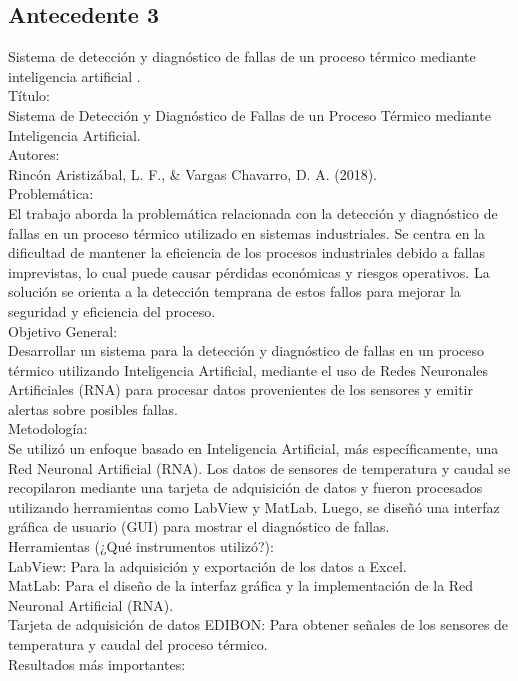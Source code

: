 \subsection{Antecedente 3}
Sistema de detección y diagnóstico de fallas de un proceso térmico mediante
inteligencia artificial \cite{Var} . \\
Título:\\
Sistema de Detección y Diagnóstico de Fallas de un Proceso Térmico mediante Inteligencia Artificial. \\
Autores: \\
Rincón Aristizábal, L. F., \& Vargas Chavarro, D. A. (2018). \\
Problemática: \\
El trabajo aborda la problemática relacionada con la detección y diagnóstico de fallas en un proceso térmico utilizado en sistemas industriales. Se centra en la dificultad de mantener la eficiencia de los procesos industriales debido a fallas imprevistas, lo cual puede causar pérdidas económicas y riesgos operativos. La solución se orienta a la detección temprana de estos fallos para mejorar la seguridad y eficiencia del proceso.\\
Objetivo General: \\
Desarrollar un sistema para la detección y diagnóstico de fallas en un proceso térmico utilizando Inteligencia Artificial, mediante el uso de Redes Neuronales Artificiales (RNA) para procesar datos provenientes de los sensores y emitir alertas sobre posibles fallas.\\
Metodología: \\
Se utilizó un enfoque basado en Inteligencia Artificial, más específicamente, una Red Neuronal Artificial (RNA). Los datos de sensores de temperatura y caudal se recopilaron mediante una tarjeta de adquisición de datos y fueron procesados utilizando herramientas como LabView y MatLab. Luego, se diseñó una interfaz gráfica de usuario (GUI) para mostrar el diagnóstico de fallas.\\
Herramientas (¿Qué instrumentos utilizó?): \\
LabView: Para la adquisición y exportación de los datos a Excel. \\
MatLab: Para el diseño de la interfaz gráfica y la implementación de la Red Neuronal Artificial (RNA). \\
Tarjeta de adquisición de datos EDIBON: Para obtener señales de los sensores de temperatura y caudal del proceso térmico. \\
Resultados más importantes: \\
